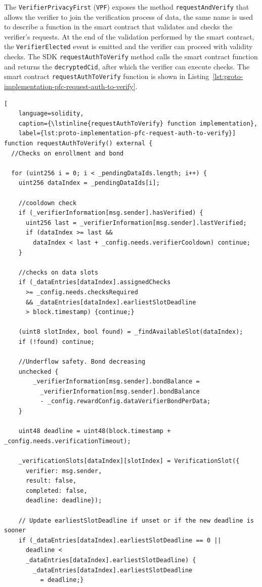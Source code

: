 The \texttt{VerifierPrivacyFirst} (\texttt{VPF}) exposes the method \lstinline{requestAndVerify} that allows the verifier to join the verification process of data, the same name is used to describe a function in the smart contract that validates and checks the verifier's requests.
At the end of the validation performed by the smart contract, the \lstinline{VerifierElected} event is emitted and the verifier can proceed with validity checks.
The SDK \lstinline{requestAuthToVerify} method calls the smart contract function and returns the \lstinline{decryptedCid}, after which the verifier can execute checks.
The smart contract \lstinline{requestAuthToVerify} function is shown in Listing~\ref{lst:proto-implementation-pfc-request-auth-to-verify}.

\begin{lstlisting}[
    language=solidity,
    caption={\lstinline{requestAuthToVerify} function implementation},
    label={lst:proto-implementation-pfc-request-auth-to-verify}]
function requestAuthToVerify() external {
  //Checks on enrollment and bond

  for (uint256 i = 0; i < _pendingDataIds.length; i++) {
    uint256 dataIndex = _pendingDataIds[i];

    //cooldown check
    if (_verifierInformation[msg.sender].hasVerified) {
      uint256 last = _verifierInformation[msg.sender].lastVerified;
      if (dataIndex >= last &&
        dataIndex < last + _config.needs.verifierCooldown) continue;
    }

    //checks on data slots
    if (_dataEntries[dataIndex].assignedChecks
      >= _config.needs.checksRequired
      && _dataEntries[dataIndex].earliestSlotDeadline
      > block.timestamp) {continue;}

    (uint8 slotIndex, bool found) = _findAvailableSlot(dataIndex);
    if (!found) continue;

    //Underflow safety. Bond decreasing
    unchecked {
        _verifierInformation[msg.sender].bondBalance =
          _verifierInformation[msg.sender].bondBalance
          - _config.rewardConfig.dataVerifierBondPerData;
    }

    uint48 deadline = uint48(block.timestamp + _config.needs.verificationTimeout);

    _verificationSlots[dataIndex][slotIndex] = VerificationSlot({
      verifier: msg.sender,
      result: false,
      completed: false,
      deadline: deadline});

    // Update earliestSlotDeadline if unset or if the new deadline is sooner
    if (_dataEntries[dataIndex].earliestSlotDeadline == 0 ||
      deadline <
      _dataEntries[dataIndex].earliestSlotDeadline) {
        _dataEntries[dataIndex].earliestSlotDeadline
          = deadline;}


\end{lstlisting}
